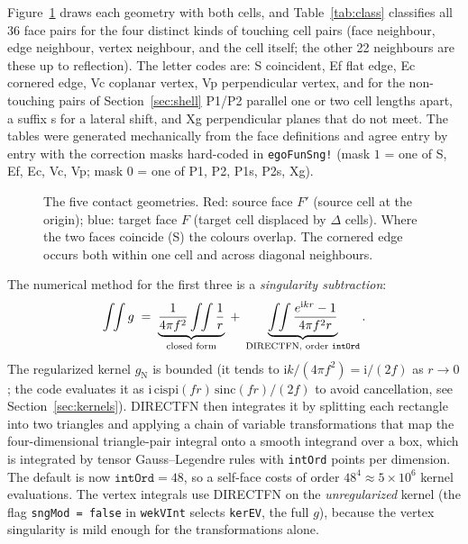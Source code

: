 \documentclass[11pt]{article}
\theoremstyle{remark}
\newcommand{\ii}{\mathrm{i}}
\newcommand{\code}[1]{\texttt{#1}}
\begin{document}
Figure~\ref{fig:contact} draws each geometry with both cells, and Table~\ref{tab:class}
classifies all 36 face pairs for the four distinct kinds of touching cell pairs (face
neighbour, edge neighbour, vertex neighbour, and the cell itself; the other 22
neighbours are these up to reflection). The letter codes are: S coincident, Ef flat
edge, Ec cornered edge, Vc coplanar vertex, Vp perpendicular vertex, and for the
non-touching pairs of Section~\ref{sec:shell} P1/P2 parallel one or two cell lengths
apart, a suffix s for a lateral shift, and Xg perpendicular planes that do not meet.
The tables were generated mechanically from the face definitions and agree entry by
entry with the correction masks hard-coded in \code{egoFunSng!} (mask $1$ = one of
S, Ef, Ec, Vc, Vp; mask $0$ = one of P1, P2, P1s, P2s, Xg).

\begin{figure}[htbp]

\caption{The five contact geometries. Red: source face $F'$ (source cell at the
origin); blue: target face $F$ (target cell displaced by $\Delta$ cells). Where the two
faces coincide (S) the colours overlap. The cornered edge occurs both within one cell
and across diagonal neighbours.}
\label{fig:contact}
\end{figure}

\begin{table}[htbp]

\caption{Geometry of every face pair $(F, F')$, target face $F$ in rows and source
face $F'$ in columns, for the source cell itself and its three kinds of touching
neighbour. Codes as in the text.}
\label{tab:class}
\end{table}

The numerical method for the first three is a \emph{singularity subtraction}:
\begin{equation}
\int\!\!\int g \;=\; \underbrace{\frac{1}{4\pi f^2}\int\!\!\int \frac{1}{r}}_{\text{closed form}}
\;+\; \underbrace{\int\!\!\int \frac{e^{\ii k r}-1}{4\pi f^2 r}}_{\text{DIRECTFN, order \code{intOrd}}} .
\label{eq:split}
\end{equation}
The regularized kernel $g_{\mathrm{N}}$ is bounded (it tends to $\ii k/(4\pi f^2) =
\ii/(2 f)$ as $r\to 0$; the code evaluates it as $\ii\,\mathrm{cispi}(fr)\,\mathrm{sinc}(fr)/(2f)$
to avoid cancellation, see Section~\ref{sec:kernels}). DIRECTFN then integrates it by
splitting each rectangle into two triangles and applying a chain of variable
transformations that map the four-dimensional triangle-pair integral onto a smooth
integrand over a box, which is integrated by tensor Gauss--Legendre rules with
\code{intOrd} points per dimension. The default is now $\code{intOrd} = 48$, so a
self-face costs of order $48^4 \approx 5\times 10^6$ kernel evaluations. The vertex
integrals use DIRECTFN on the \emph{unregularized} kernel (the flag \code{sngMod =
false} in \code{wekVInt} selects \code{kerEV}, the full $g$), because the vertex
singularity is mild enough for the transformations alone.
\end{document}
